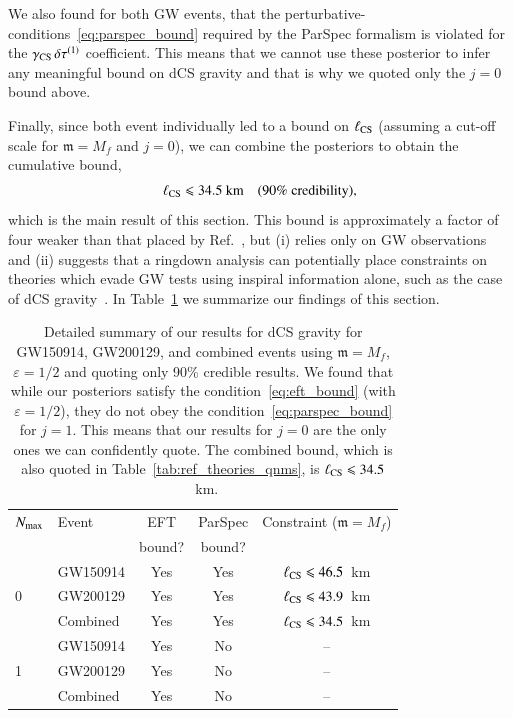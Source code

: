 \documentclass[twocolumn,
               prd,
               aps,
               superscriptaddress,
               tightenlines,
               nofootinbib,
               eqsecnum,
               amsfonts,
               amsmath,
               longbibliography]{revtex4-1}
\newcommand{\gm}{\mathfrak{m}}
\begin{document}
We also found for both GW events, that the
perturbative-conditions~\eqref{eq:parspec_bound} required by the ParSpec
formalism is violated for the $\gamma_{\rm CS} \, \delta \tau^{(1)}$ coefficient.
%
This means that we cannot use these posterior to infer any meaningful bound on dCS gravity
and that is why we quoted only the $j=0$ bound above.

Finally, since both event individually led to a bound on $\ell_{\rm CS}$
(assuming a cut-off scale for $\gm = M_{f}$ and $j = 0$), we can combine the
posteriors to obtain the cumulative bound,
%
\begin{equation}
\ell_{\rm CS} \leqslant 34.5~\textrm{km}
\quad \textrm{(90\% credibility)},
\end{equation}
%
which is the main result of this section.
%
This bound is approximately a factor of four weaker than that placed by
Ref.~\cite{Silva:2020acr}, but
%
(i) relies only on GW observations and
%
(ii) suggests that a ringdown analysis can potentially place constraints on
theories which evade GW tests using inspiral information alone, such as the
case of dCS gravity~\cite{Nair:2019iur,Perkins:2021mhb,Lyu:2022gdr}.
%
In Table~\ref{tab:summary_dcs} we summarize our findings of this section.

\begin{table}[h]
\begin{tabular}{l l c c c}
\hline
\hline
$N_{\rm max}$ & Event & EFT    & ParSpec & Constraint ($\gm = M_{f}$) \\
              &       & bound? & bound?  &                            \\
\hline
      & GW150914 & Yes & Yes & $\ell_{\rm CS} \leqslant 46.5$~km \\
0     & GW200129 & Yes & Yes & $\ell_{\rm CS} \leqslant 43.9$~km \\
      & Combined & Yes & Yes & \cellcolor{blue!10}$\ell_{\rm CS} \leqslant 34.5$~km \\
\hline
      & GW150914 & Yes & No  & --                                 \\
1     & GW200129 & Yes & No  & --                                 \\
      & Combined & Yes & No  & --                                 \\
\hline
\hline
\end{tabular}
\caption{Detailed summary of our results for dCS gravity for GW150914, GW200129, and
combined events using $\gm = M_{f}$, $\varepsilon = 1/2$ and quoting only 90\% credible results.
%
We found that while our posteriors satisfy the condition~\eqref{eq:eft_bound} (with $\varepsilon = 1/2$),
they do not obey the condition~\eqref{eq:parspec_bound} for $j = 1$. This means
that our results for $j=0$ are the only ones we can confidently quote.
%
The combined bound, which is also quoted in Table~\ref{tab:ref_theories_qnms},
is $\ell_{\rm CS} \leqslant 34.5$~km.
}
\label{tab:summary_dcs}
\end{table}
\end{document}
